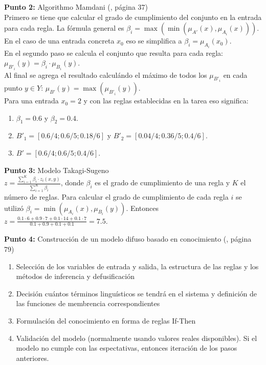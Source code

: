 \documentclass[10pt,onecolumn,twoside,letterpaper]{article}
\begin{document}
\par{\bf \large Punto 2:} Algorithmo Mamdani (\cite{Babuska1999}, página 37)\\
Primero se tiene que calcular el grado de cumplimiento del conjunto en la entrada para cada regla. La fórmula general es $\beta_i = \max(\min(\mu_{A'}(x),\mu_{A_i}(x)))$. En el caso de una entrada concreta $x_0$ eso se simplifica a $\beta_i=\mu_{A_i}(x_0)$.\\
En el segundo paso se calcula el conjunto que resulta para cada regla: $\mu_{B'_i}(y)=\beta_i\cdot \mu_{B_i}(y)$.\\
Al final se agrega el resultado calculándo el máximo de todos los $\mu_{B'_i}$ en cada punto $y\in Y$: $\mu_{B'}(y)=\max(\mu_{B'_i}(y))$.\\
Para una entrada $x_0=2$ y con las reglas establecidas en la tarea eso significa:
\begin{enumerate}
\item $\beta_1=0.6$ y $\beta_2=0.4$.
\item $B'_1=[ 0.6/4; 0.6/5; 0.18/6]$ y $B'_2=[0.04/4; 0.36/5; 0.4/6]$.
\item $B'=[0.6/4; 0.6/5; 0.4/6]$.
\end{enumerate}

\par{\bf \large Punto 3:} Modelo Takagi-Sugeno\\
$z = \frac{\sum_{i=1}^{K}\beta_i\cdot z_i(x,y)}{\sum_{i=1}^{K} \beta_i}$, donde $\beta_i$ es el grado de cumplimiento de una regla y $K$ el número de reglas. Para calcular el grado de cumplimiento de cada regla $i$ se utilizó $\beta_i=\min(\mu_{A_i}(x),\mu_{B_i}(y))$. Entonces $z= \frac{0.1\cdot 6+0.9\cdot 7+0.1\cdot 14+0.1\cdot 7}{0.1+0.9+0.1+0.1}=7.5$.\\

\par{\bf \large Punto 4:} Construcción de un modelo difuso basado en conocimiento (\cite{Babuska1999}, página 79)
\begin{enumerate}
\item Selección de los variables de entrada y salida, la estructura de las reglas y los métodos de inferencia y defusificación
\item Decisión cuántos términos linguísticos se tendrá en el sistema y definición de las funciones de membrencia correspondientes
\item Formulación del conocimiento en forma de reglas If-Then
\item Validación del modelo (normalmente usando valores reales disponibles). Si el modelo no cumple con las espectativas, entonces iteración de los pasos anteriores.
\end{enumerate}
\end{document}
